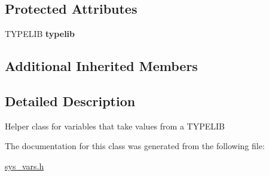 \subsection*{Protected Attributes}
\begin{DoxyCompactItemize}
\item 
\mbox{\label{classSys__var__typelib_a7c7070cd5d426d94e4ce0d4246f3d86a}} 
T\+Y\+P\+E\+L\+IB {\bfseries typelib}
\end{DoxyCompactItemize}
\subsection*{Additional Inherited Members}


\subsection{Detailed Description}
Helper class for variables that take values from a T\+Y\+P\+E\+L\+IB 

The documentation for this class was generated from the following file\+:\begin{DoxyCompactItemize}
\item 
\mbox{\hyperlink{sys__vars_8h}{sys\+\_\+vars.\+h}}\end{DoxyCompactItemize}
